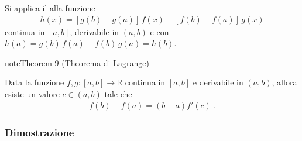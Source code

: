 \documentclass[letterpaper,10pt,italian]{jupyterBook}
\begin{document}
\sphinxAtStartPar
Si applica il {\hyperref[\detokenize{ch/infinitesimal_calculus/derivatives:infinitesimal-calculus-derivatives-thm-rolle}]{}} alla funzione
\begin{equation*}
\begin{split}h(x) = \left[ g(b) - g(a) \right] \, f(x) - \left[ f(b) - f(a) \right] \, g(x)\end{split}
\end{equation*}
\sphinxAtStartPar
continua in \([a,b]\), derivabile in \((a,b)\) e con \(h(a) = g(b) \, f(a) - f(b) \, g(a) = h(b)\).
\label{ch/infinitesimal_calculus/derivatives:thm:infinitesimal-calculus:derivatives:thm:lagrange}
\begin{sphinxadmonition}{note}{Theorem 9 (Theorema di Lagrange)}



\sphinxAtStartPar
Data la funzione \(f, g: [a,b] \rightarrow \mathbb{R}\) continua in \([a,b]\) e derivabile in \((a,b)\), allora esiste un valore \(c \in (a,b)\) tale che
\begin{equation*}
\begin{split}f(b) - f(a) = (b -  a) f'(c) \ .\end{split}
\end{equation*}\end{sphinxadmonition}
\subsubsection*{Dimostrazione}
\end{document}
